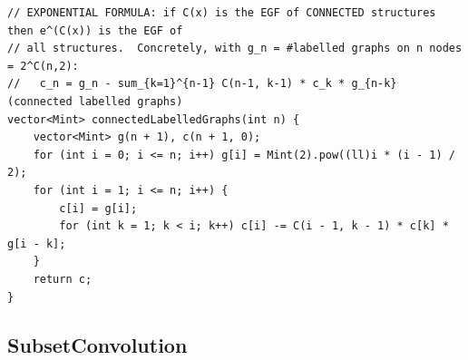 \documentclass[9pt,a4paper,twocolumn]{extarticle}
\begin{document}
\begin{lstlisting}
// EXPONENTIAL FORMULA: if C(x) is the EGF of CONNECTED structures then e^(C(x)) is the EGF of
// all structures.  Concretely, with g_n = #labelled graphs on n nodes = 2^C(n,2):
//   c_n = g_n - sum_{k=1}^{n-1} C(n-1, k-1) * c_k * g_{n-k}      (connected labelled graphs)
vector<Mint> connectedLabelledGraphs(int n) {
    vector<Mint> g(n + 1), c(n + 1, 0);
    for (int i = 0; i <= n; i++) g[i] = Mint(2).pow((ll)i * (i - 1) / 2);
    for (int i = 1; i <= n; i++) {
        c[i] = g[i];
        for (int k = 1; k < i; k++) c[i] -= C(i - 1, k - 1) * c[k] * g[i - k];
    }
    return c;
}
\end{lstlisting}

\filbreak
\subsection{SubsetConvolution}
\nopagebreak
\end{document}
